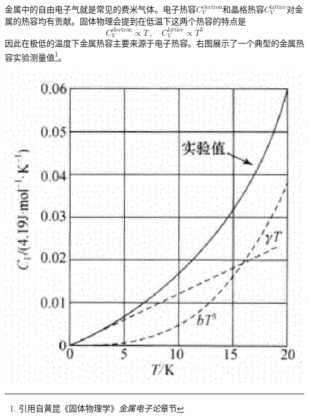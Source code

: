 \documentclass[]{article}
\begin{document}
	\begin{multicols}{2}
		金属中的自由电子气就是常见的费米气体。电子热容$ C_V^{\text{electron}} $和晶格热容$ C_V^{\text{lattice}} $对金属的热容均有贡献。固体物理会提到在低温下这两个热容的特点是
		\[C_V^{\text{electron}}\propto T\,,\quad C_V^{\text{lattice}}\propto T^3\]
		因此在极低的温度下金属热容主要来源于电子热容。右图展示了一个典型的金属热容实验测量值\footnote{引用自黄昆《固体物理学》\emph{金属电子论}章节}。
		\begin{Figure}
			\includegraphics[width=\linewidth]{MetalCapacity}
		\end{Figure}
	\end{multicols}
\end{document}
